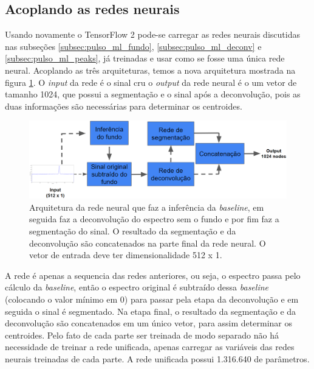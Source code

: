 \documentclass[a4paper,12pt,oneside]{book}
\begin{document}
\subsection{Acoplando as redes neurais}

\par Usando novamente o TensorFlow 2 pode-se carregar as redes neurais discutidas nas subseções \ref{subsec:pulso_ml_fundo}, \ref{subsec:pulso_ml_deconv} e \ref{subsec:pulso_ml_peaks}, já treinadas e usar como se fosse uma única rede neural. Acoplando as três arquiteturas, temos a nova arquitetura mostrada na figura \ref{fig:arq:source_to_segmentation}. O \textit{input} da rede é o sinal cru o \textit{output} da rede neural é o um vetor de tamanho 1024, que possui a segmentação e o sinal após a deconvolução, pois as duas informações são necessárias para determinar os centroides.

\begin{figure}[H]
    \centering
    \includegraphics[scale = 0.35]{figs/arq_source_segmentation.png}
    \caption{Arquitetura da rede neural que faz a inferência da \textit{baseline}, em seguida faz a deconvolução do espectro sem o fundo e por fim faz a segmentação do sinal. O resultado da segmentação e da deconvolução são concatenados na parte final da rede neural. O vetor de entrada deve ter dimensionalidade 512 x 1.}
    \label{fig:arq:source_to_segmentation}
\end{figure}

\par A rede é apenas a sequencia das redes anteriores, ou seja, o espectro passa pelo cálculo da \textit{baseline}, então o espectro original é subtraído dessa \textit{baseline} (colocando o valor mínimo em 0) para passar pela etapa da deconvolução e em seguida o sinal é segmentado. Na etapa final, o resultado da segmentação e da deconvolução são concatenados em um único vetor, para assim determinar os centroides. Pelo fato de cada parte ser treinada de modo separado não há necessidade de treinar a rede unificada, apenas carregar as variáveis das redes neurais treinadas de cada parte. A rede unificada possui 1.316.640 de parâmetros.
\end{document}
